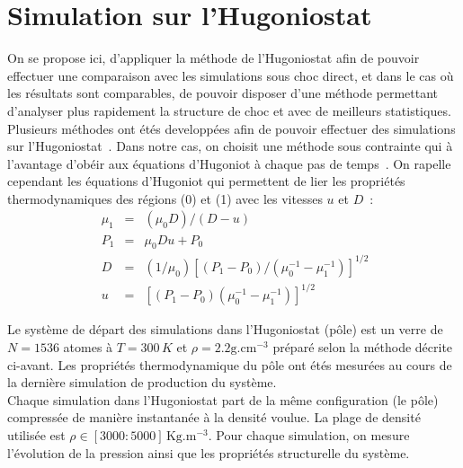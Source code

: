 \documentclass[aps,10pt,twocolumn]{revtex4}
\newcommand{\mrm}[1]{\ensuremath{\mathrm{#1}}\xspace}
\begin{document}
\section{Simulation sur l'Hugoniostat}

On se propose ici, d'appliquer la m\'ethode de l'Hugoniostat afin de pouvoir effectuer une
comparaison avec les simulations sous choc direct, et dans le cas o\`u les r\'esultats sont
comparables, de pouvoir disposer d'une m\'ethode permettant d'analyser plus rapidement la
structure de choc et avec de meilleurs statistiques. Plusieurs m\'ethodes ont \'et\'es
developp\'ees afin de pouvoir effectuer des simulations sur l'Hugoniostat~\cite{HUG01,HUG02,HUG03}. Dans notre
cas, on choisit une m\'ethode sous contrainte qui \`a l'avantage d'ob\'eir aux \'equations
d'Hugoniot \`a chaque pas de temps~\cite{HUG03}. On rapelle cependant les \'equations
d'Hugoniot qui permettent de lier les propri\'et\'es thermodynamiques des r\'egions (0) et (1)
avec les vitesses $u$ et $D$~:
\begin{equation}\
	\begin{array}{ccc}
	\mu_1	&=&		\left(\mu_0D\right)/\left(D-u\right)\\
	P_1		&=&		\mu_0Du+P_0\\
	D		&=&		(1/\mu_0)\left[ (P_1-P_0)/(\mu_0^{-1} - \mu_1^{-1})  \right]^{1/2}\\
	u		&=&		\left[  (P_1-P_0)(\mu_0^{-1} - \mu_1^{-1})\right]^{1/2}
	\end{array}
\label{eqn:hug}	
\end{equation}

Le syst\`eme de d\'epart des simulations dans l'Hugoniostat (p\^ole) est un verre de
$N=1536$ atomes \`a $T=300\, K$ et $\rho=2.2 \mrm{g.cm^{-3}}$ pr\'epar\'e selon la m\'ethode d\'ecrite ci-avant.
Les propri\'et\'es thermodynamique du p\^ole ont \'et\'es mesur\'ees au cours de la derni\`ere
simulation de production du syst\`eme.\\ 


Chaque simulation dans l'Hugoniostat part de la m\^eme configuration (le p\^ole) compress\'ee de mani\`ere
instantan\'ee \`a la densit\'e voulue. La plage de densit\'e utilis\'ee est $\rho \in
[3000:5000]\,\mrm{Kg.m^{-3}}$. Pour chaque simulation, on mesure l'\'evolution de la pression
ainsi que les propri\'et\'es structurelle du syst\`eme.\\
\end{document}
